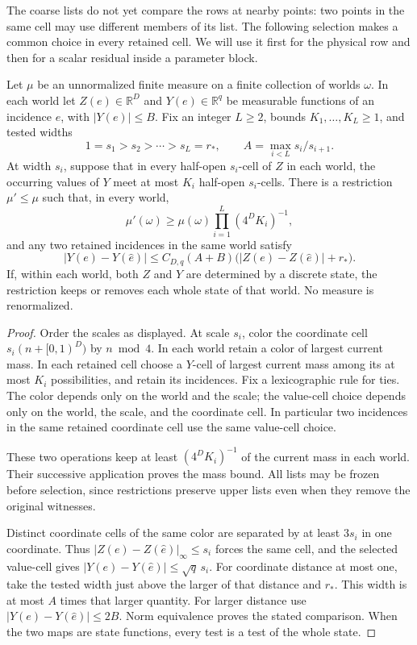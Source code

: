 The coarse lists do not yet compare the rows at nearby points: two
points in the same cell may use different members of its list. The
following selection makes a common choice in every retained cell. We
will use it first for the physical row and then for a scalar residual
inside a parameter block.

\begin{lemma}
\label{a05:common-local-choice}
Let \(\mu\) be an unnormalized finite measure on a finite collection of
worlds \(\omega\). In each world let \(Z(e)\in\mathbb R^D\) and
\(Y(e)\in\mathbb R^q\) be measurable functions of an incidence \(e\),
with \(|Y(e)|\leq B\). Fix an integer \(L\geq2\), bounds
\(K_1,\ldots,K_L\geq1\), and tested widths
\[
 1=s_1>s_2>\cdots>s_L=r_*,\qquad
 A=\max_{i<L}s_i/s_{i+1}.
\]
At width \(s_i\), suppose that in every half-open \(s_i\)-cell of
\(Z\) in each world, the occurring values of \(Y\) meet at most \(K_i\)
half-open \(s_i\)-cells. There is a restriction \(\mu'\leq\mu\) such
that, in every world,
\[
 \mu'(\omega)\geq
 \mu(\omega)\prod_{i=1}^L(4^DK_i)^{-1},
\]
and any two retained incidences in the same world satisfy
\[
 |Y(e)-Y(\widehat e)|
 \leq C_{D,q}(A+B)
       \bigl(|Z(e)-Z(\widehat e)|+r_*\bigr).
\]
If, within each world, both \(Z\) and \(Y\) are determined by a
discrete state, the restriction keeps or removes each whole state
of that world. No measure is renormalized.
\end{lemma}

\begin{proof}
Order the scales as displayed. At scale \(s_i\), color the coordinate
cell \(s_i(n+[0,1)^D)\) by \(n\bmod4\). In each world retain a color
of largest current mass. In each retained cell choose a \(Y\)-cell
of largest current mass among its at most \(K_i\) possibilities,
and retain its incidences. Fix a lexicographic rule for ties.
The color depends only on the world and the scale; the value-cell
choice depends only on the world, the scale, and the coordinate
cell. In particular two incidences in the same retained coordinate
cell use the same value-cell choice.

These two operations keep at least \((4^DK_i)^{-1}\) of the current
mass in each world. Their successive application proves the mass
bound. All lists may be frozen before selection, since restrictions
preserve upper lists even when they remove the original witnesses.

Distinct coordinate cells of the same color are separated by at
least \(3s_i\) in one coordinate. Thus
\(|Z(e)-Z(\widehat e)|_\infty\leq s_i\) forces the same cell,
and the selected value-cell gives
\(|Y(e)-Y(\widehat e)|\leq\sqrt q\,s_i\).
For coordinate distance at most one, take the tested width just
above the larger of that distance and \(r_*\). This width is at
most \(A\) times that larger quantity. For larger distance use
\(|Y(e)-Y(\widehat e)|\leq2B\). Norm equivalence proves the stated
comparison. When the two maps are state functions, every test is
a test of the whole state.
\end{proof}

